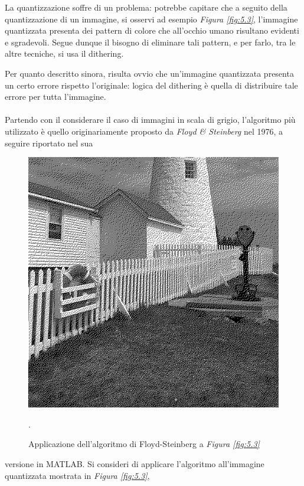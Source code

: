 \documentclass{subfiles}
\begin{document}
La quantizzazione soffre di un problema: potrebbe capitare che a seguito della quantizzazione di un immagine, si osservi ad esempio \emph{Figura \ref{fig:5.3}},
l'immagine quantizzata presenta dei pattern di colore che all'occhio umano risultano evidenti e sgradevoli.
Segue dunque il bisogno di eliminare tali pattern, e per farlo, tra le altre tecniche, si usa il dithering.

Per quanto descritto sinora, risulta ovvio che un'immagine quantizzata presenta un certo errore rispetto l'originale:
logica del dithering è quella di distribuire tale errore per tutta l'immagine.
\\ \\
Partendo con il considerare il caso di immagini in scala di grigio, l'algoritmo più utilizzato è quello originariamente proposto da \emph{Floyd \emph{\&} Steinberg} nel 1976,
a seguire riportato nel sua
\begin{figure}
    \centering
    \includegraphics[scale = 0.325]{../Images/Lighthouse/DitheredLighthouse.png}
    \caption{Applicazione dell'algoritmo di Floyd-Steinberg a \emph{Figura \ref{fig:5.3}}}.
    \label{fig:5.4}
\end{figure}
versione in MATLAB. Si consideri di applicare l'algoritmo all'immagine quantizzata mostrata in \emph{Figura \ref{fig:5.3}},
\end{document}
